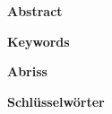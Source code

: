 

%
%
%
%
%
%
%
%
%
%
\clearpage \null 
\vfil 
\begin{center}
	\textbf{Abstract} 
\end{center}




\vspace{10em} 
\begin{center}
	\textbf{Keywords} \par 
\end{center}

\vfil

\newpage
\clearpage \null 
\vfil 
\begin{center}
	\textbf{Abriss} 
\end{center}




\vspace{10em} 
\begin{center}
	\textbf{Schlüsselwörter} \par 
\end{center}

\vfil
